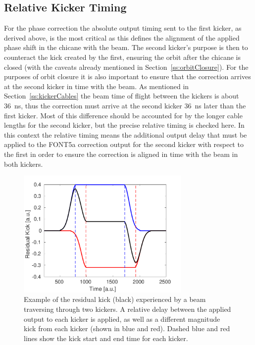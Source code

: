 \subsection{Relative Kicker Timing}
\label{ss:relativeTiming}

For the phase correction the absolute output timing sent to the first kicker, as derived above, is the most critical as this defines the alignment of the applied phase shift in the chicane with the beam. The second kicker's purpose is then to counteract the kick created by the first, ensuring the orbit after the chicane is closed (with the caveats already mentioned in Section~\ref{ss:orbitClosure}). For the purposes of orbit closure it is also important to ensure that the correction arrives at the second kicker in time with the beam. As mentioned in Section~\ref{ss:kickerCables} the beam time of flight between the kickers is about 36~ns, thus the correction must arrive at the second kicker 36~ns later than the first kicker. Most of this difference should be accounted for by the longer cable lengths for the second kicker, but the precise relative timing is checked here. In this context the relative timing means the additional output delay that must be applied to the FONT5a correction output for the second kicker with respect to the first in order to ensure the correction is aligned in time with the beam in both kickers.


\begin{figure}
  \centering
  \includegraphics[width=0.75\textwidth]{Figures/commissioning/relDelay_sim}
  \caption{Example of the residual kick (black) experienced by a beam traversing through two kickers. A relative delay between the applied output to each kicker is applied, as well as a different magnitude kick from each kicker (shown in blue and red). Dashed blue and red lines show the kick start and end time for each kicker.}
  \label{f:relDelay_sim}
\end{figure}


